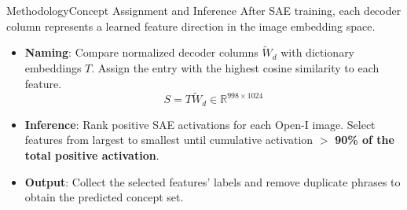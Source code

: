 \begin{frame}{Methodology}{Concept Assignment and Inference}
  After SAE training, each decoder column represents a learned feature direction
  in the image embedding space.
  \medskip
  \begin{itemize}
    \item \textbf{Naming}: Compare normalized decoder columns $\widetilde{W}_d$ with
    dictionary embeddings $T$. Assign the entry with the highest cosine similarity
    to each feature.
    {
    \[
      S=T\widetilde{W}_d\in\mathbb{R}^{998\times1024}
    \]
    }
    \item \textbf{Inference}: Rank positive SAE activations for each Open-I image.
    Select features from largest to smallest until cumulative activation $>$ \textbf{90\% of the total positive activation}.
    \item \textbf{Output}: Collect the selected features' labels and remove duplicate
    phrases to obtain the predicted concept set.
  \end{itemize}

\end{frame}


